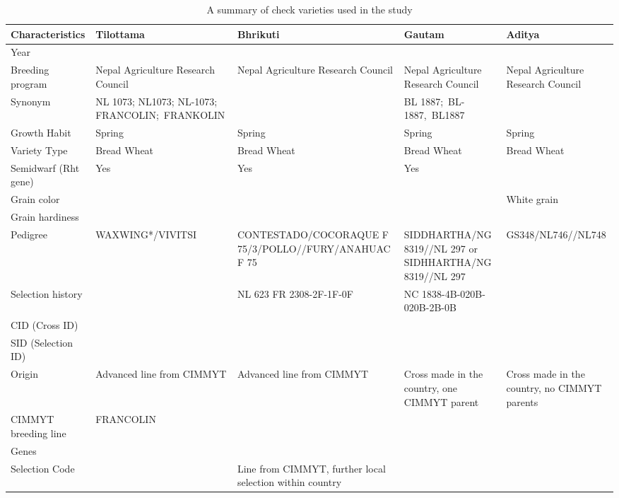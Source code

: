 \documentclass[12pt,oneside]{dukestatscithesis} %
\theoremstyle{definition}
\theoremstyle{definition}
\theoremstyle{definition}
\theoremstyle{remark}
\begin{document}
\begingroup\fontsize{8}{10}\selectfont
\begin{longtable}[t]{>{\centering\arraybackslash}p{2.0cm}>{\centering\arraybackslash}p{3.2cm}>{\centering\arraybackslash}p{3.2cm}>{\centering\arraybackslash}p{3.2cm}>{\centering\arraybackslash}p{3.2cm}}
\caption{\label{tab:check-vars-info}A summary of check varieties used in the study}\\
\toprule
Characteristics & Tilottama\footnotemark{}\strut \footnotetext{\url{http://wheatatlas.org/varieties/detail/26413}} & Bhrikuti\footnotemark{}\strut \footnotetext{\url{http://wheatatlas.org/varieties/detail/22378}} & Gautam\footnotemark{}\strut \footnotetext{\url{http://wheatatlas.org/varieties/detail/22383}} & Aditya\footnotemark{}\strut \footnotetext{\url{http://wheatatlas.org/varieties/detail/22373}}\\
\midrule
Year & 2014 & 1994 & 2002 & 2010\\
Breeding program & Nepal Agriculture Research Council & Nepal Agriculture Research Council & Nepal Agriculture Research Council & Nepal Agriculture Research Council\\
Synonym & NL 1073; NL1073; NL-1073; FRANCOLIN; FRANKOLIN &  & BL 1887; BL-1887, BL1887 & \\
Growth Habit & Spring & Spring & Spring & Spring\\
Variety Type & Bread Wheat & Bread Wheat & Bread Wheat & Bread Wheat\\
\addlinespace
Semidwarf (Rht gene) & Yes & Yes & Yes & \\
Grain color &  &  &  & White grain\\
Grain hardiness &  &  &  & \\
Pedigree & WAXWING*\-2/VIVITSI & CONTESTAD\-O/COCORAQUE F 75/3/POLLO//F\-URY/ANAHUAC F 75 & SIDDHARTHA/NG 8319//NL 297 or SIDHHARTHA/NG 8319//NL 297 & GS348/NL746//NL748\\
Selection history &  & NL 623 FR 2308-2F-1F-0F & NC 1838-4B-020B-020B-2B-0B & \\
\addlinespace
CID (Cross ID) &  & 251774 &  & \\
SID (Selection ID) &  & 0 &  & \\
Origin & Advanced line from CIMMYT & Advanced line from CIMMYT & Cross made in the country, one CIMMYT parent & Cross made in the country, no CIMMYT parents\\
CIMMYT breeding line & FRANCOLIN &  &  & \\
Genes &  &  &  & \\
\addlinespace
Selection Code &  & Line from CIMMYT, further local selection within country &  & \\

\end{longtable}
\end{document}
